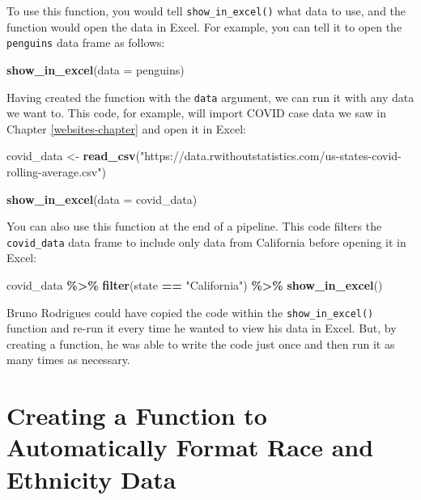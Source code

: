 \documentclass[
]{book}
\newenvironment{Shaded}{\begin{snugshade}}{\end{snugshade}}
\newcommand{\AttributeTok}[1]{\textcolor[rgb]{0.13,0.29,0.53}{#1}}
\newcommand{\FunctionTok}[1]{\textcolor[rgb]{0.13,0.29,0.53}{\textbf{#1}}}
\newcommand{\NormalTok}[1]{#1}
\newcommand{\OtherTok}[1]{\textcolor[rgb]{0.56,0.35,0.01}{#1}}
\newcommand{\SpecialCharTok}[1]{\textcolor[rgb]{0.81,0.36,0.00}{\textbf{#1}}}
\newcommand{\StringTok}[1]{\textcolor[rgb]{0.31,0.60,0.02}{#1}}
\begin{document}
To use this function, you would tell \texttt{show\_in\_excel()} what data to use, and the function would open the data in Excel. For example, you can tell it to open the \texttt{penguins} data frame as follows:

\begin{Shaded}
\begin{Highlighting}[]
\FunctionTok{show\_in\_excel}\NormalTok{(}\AttributeTok{data =}\NormalTok{ penguins)}
\end{Highlighting}
\end{Shaded}

Having created the function with the \texttt{data} argument, we can run it with any data we want to. This code, for example, will import COVID case data we saw in Chapter \ref{websites-chapter} and open it in Excel:

\begin{Shaded}
\begin{Highlighting}[]
\NormalTok{covid\_data }\OtherTok{\textless{}{-}} \FunctionTok{read\_csv}\NormalTok{(}\StringTok{"https://data.rwithoutstatistics.com/us{-}states{-}covid{-}rolling{-}average.csv"}\NormalTok{)}

\FunctionTok{show\_in\_excel}\NormalTok{(}\AttributeTok{data =}\NormalTok{ covid\_data)}
\end{Highlighting}
\end{Shaded}

You can also use this function at the end of a pipeline. This code filters the \texttt{covid\_data} data frame to include only data from California before opening it in Excel:

\begin{Shaded}
\begin{Highlighting}[]
\NormalTok{covid\_data }\SpecialCharTok{\%\textgreater{}\%}
  \FunctionTok{filter}\NormalTok{(state }\SpecialCharTok{==} \StringTok{"California"}\NormalTok{) }\SpecialCharTok{\%\textgreater{}\%}
  \FunctionTok{show\_in\_excel}\NormalTok{()}
\end{Highlighting}
\end{Shaded}

Bruno Rodrigues could have copied the code within the \texttt{show\_in\_excel()} function and re-run it every time he wanted to view his data in Excel. But, by creating a function, he was able to write the code just once and then run it as many times as necessary.

\hypertarget{creating-a-function-to-automatically-format-race-and-ethnicity-data}{%
\section*{Creating a Function to Automatically Format Race and Ethnicity Data}\label{creating-a-function-to-automatically-format-race-and-ethnicity-data}}
\end{document}
